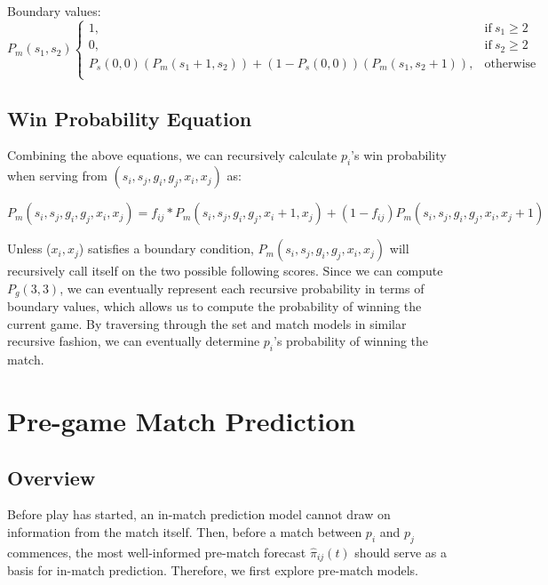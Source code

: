\documentclass[chapterprefix=false]{report}
\begin{document}
Boundary values:
\begin{equation}
    P_m(s_1,s_2) 
    \begin{cases}
      1, & \text{if}\ s_1 \geq 2 \\
      0, & \text{if}\ s_2 \geq 2 \\
      P_s(0,0)(P_m(s_1+1,s_2))+(1-P_s(0,0))(P_m(s_1,s_2+1)), & \text{otherwise}\ \\
    \end{cases}
  \end{equation}


\section{Win Probability Equation}
Combining the above equations, we can recursively calculate $p_i$'s win probability when serving from $(s_i,s_j,g_i,g_j,{x}_i,{x}_j)$ as:

\resizebox{1 \textwidth}{!} 
{
    $P_m(s_i,s_j,g_i,g_j,{x}_i,{x}_j)=f_{ij}*P_m(s_i,s_j,g_i,g_j,{x}_i+1,{x}_j) + (1-f_{ij}) P_m(s_i,s_j,g_i,g_j,{x}_i,{x}_j+1)$ 
}


Unless (${x}_i,{x}_j$) satisfies a boundary condition, $P_m(s_i,s_j,g_i,g_j,{x}_i,{x}_j)$ will recursively call itself on the two possible following scores. Since we can compute $P_g(3,3)$, we can eventually represent each recursive probability in terms of boundary values, which allows us to compute the probability of winning the current game. By traversing through the set and match models in similar recursive fashion, we can eventually determine $p_i$'s probability of winning the match.  


\chapter{Pre-game Match Prediction}

\section{Overview}
Before play has started, an in-match prediction model cannot draw on information from the match itself. Then, before a match between $p_i$ and $p_j$ commences, the most well-informed pre-match forecast $\hat{\pi}_{ij}(t)$ should serve as a basis for in-match prediction. Therefore, we first explore pre-match models.
\end{document}
